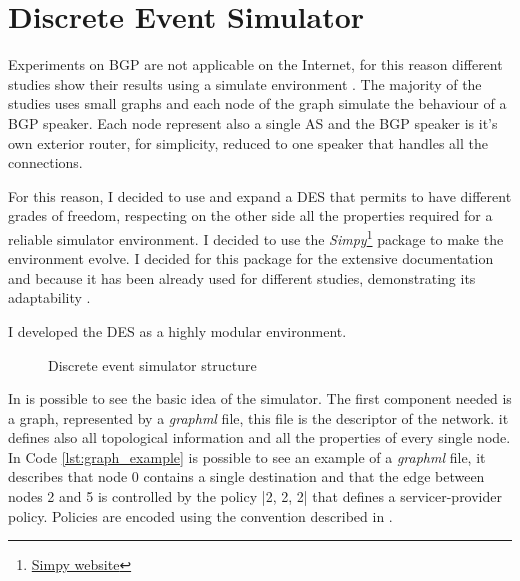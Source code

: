 \chapter{Discrete Event Simulator}
\label{cha:des}

Experiments on \ac{BGP} are not applicable on the Internet, for this
reason different studies show their results using a simulate environment
\cite{griffin2001experimental} .
The majority of the studies uses small graphs and each node 
of the graph simulate the behaviour of a \ac{BGP} speaker.
Each node represent also a single \ac{AS} and the \ac{BGP} speaker is it's own
exterior router, for simplicity, reduced to one speaker that handles all the
connections.
 
For this reason, I decided to use and expand a \ac{DES} that permits to have
different grades of freedom, respecting on the other side all the properties
required for a reliable simulator environment.
I decided to use the \textit{Simpy}\footnote{\href{https://simpy.readthedocs.io/en/latest/index.html}{Simpy website}}
package to make the environment evolve. I decided for this package for the
extensive documentation and because it has been already used for different
studies, demonstrating its adaptability \cite{matloff2008introduction,dagkakis2013manpy}.

I developed the \ac{DES} as a highly modular environment.
\begin{figure}[h]                                                               
    \begin{center}                                                              
        
    \end{center}                                                                
    \caption{Discrete event simulator structure}                                
    \label{fig:des_structure}                                                   
\end{figure}

In  is possible to see the basic idea of the simulator.
The first component needed is a graph, represented by a \textit{graphml} file, 
this file is the descriptor of the network. 
it defines also all topological information and all the properties of every single node.
In Code \ref{lst:graph_example} is possible to see an example of a \textit{graphml} file,
it describes that node \num{0} contains a single destination and that the edge
between nodes \num{2} and \num{5} is controlled by the policy |2, 2, 2| that defines
a servicer-provider policy.
Policies are encoded using the convention described in \cite{daggitt2018rate}.

